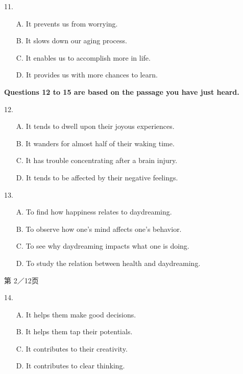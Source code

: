 \documentclass[UTF8,11pt]{ctexart}
\begin{document}
11.


\begin{itemize}[leftmargin=2em,itemsep=.2em,topsep=.4em]\item[A.] It prevents us from worrying.
\end{itemize}

\begin{itemize}[leftmargin=2em,itemsep=.2em,topsep=.4em]\item[B.] It slows down our aging process.
\item[C.] It enables us to accomplish more in life.
\item[D.] It provides us with more chances to learn.
\end{itemize}

\textbf{Questions 12 to 15 are based on the passage you have just heard.}


12.


\begin{itemize}[leftmargin=2em,itemsep=.2em,topsep=.4em]\item[A.] It tends to dwell upon their joyous experiences.
\item[B.] It wanders for almost half of their waking time.
\item[C.] It has trouble concentrating after a brain injury.
\item[D.] It tends to be affected by their negative feelings.
\end{itemize}

13.


\begin{itemize}[leftmargin=2em,itemsep=.2em,topsep=.4em]\item[A.] To find how happiness relates to daydreaming.
\end{itemize}

\begin{itemize}[leftmargin=2em,itemsep=.2em,topsep=.4em]\item[B.] To observe how one's mind affects one's behavior.
\item[C.] To see why daydreaming impacts what one is doing.
\item[D.] To study the relation between health and daydreaming.
\end{itemize}

第 2／12页


14.


\begin{itemize}[leftmargin=2em,itemsep=.2em,topsep=.4em]\item[A.] It helps them make good decisions.
\item[B.] It helps them tap their potentials.
\item[C.] It contributes to their creativity.
\item[D.] It contributes to clear thinking.
\end{itemize}
\end{document}
